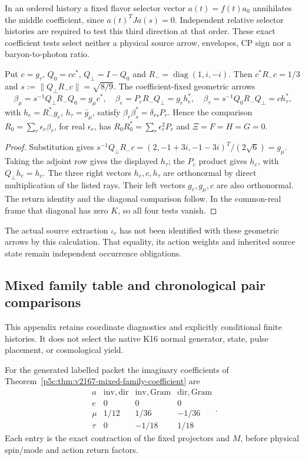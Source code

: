 \documentclass[11pt,a4paper]{article}
\begin{document}
In an ordered history a fixed flavor selector vector $a(t)=f(t)a_0$
annihilates the middle coefficient, since $a(t)^TJa(s)=0$.
Independent relative selector histories are required to test this third
direction at that order. These exact coefficient tests select neither a
physical source arrow, envelopes, CP sign nor a baryon-to-photon ratio.

\begin{corollary}
\label{p5c:cor:v2217-geometric-row-arrows}
Put $c=g_\tau$, $Q_0=cc^*$, $Q_\perp=I-Q_0$ and
$R_-=\operatorname{diag}(1,i,-i)$. Then
$c^*R_-c=1/3$ and $s:=\|Q_\perp R_-c\|=\sqrt{8/9}$.
The coefficient-fixed geometric arrows
\[
 \beta_\mu=s^{-1}Q_\perp R_-Q_0=g_\mu c^*,\quad
 \beta_e=P_eR_-Q_\perp=g_eh_e^*,\quad
 \beta_\tau=s^{-1}Q_0R_-Q_\perp=ch_\tau^*,
\]
with $h_e=R_-^*g_e$, $h_\tau=\bar g_\mu$, satisfy
$\beta_r\beta_s^*=\delta_{rs}P_r$. Hence the comparison
$R_0=\sum_r\epsilon_r\beta_r$, for real $\epsilon_r$, has
$R_0R_0^*=\sum_r\epsilon_r^2P_r$ and $\Xi=F=H=G=0$.
\end{corollary}
\begin{proof}
Substitution gives
$s^{-1}Q_\perp R_-c=(2,-1+3i,-1-3i)^T/(2\sqrt6)=g_\mu$.
Taking the adjoint row gives the displayed $h_\tau$; the $P_e$ product
gives $h_e$, with $Q_\perp h_e=h_e$. The three right vectors
$h_e,c,h_\tau$ are orthonormal by direct multiplication of the listed
rays. Their left vectors $g_e,g_\mu,c$ are also orthonormal. The return
identity and the diagonal comparison follow. In the common-real frame
that diagonal has zero $K$, so all four tests vanish.
\end{proof}
The actual source extraction $\iota_r$ has not been identified with these
geometric arrows by this calculation. That equality, its action weights
and inherited source state remain independent occurrence obligations.

\subsection{Mixed family table and chronological pair comparisons}
\label{p5c:app:v2167-cpbl2-comparisons}
This appendix retains coordinate diagnostics and explicitly conditional
finite histories. It does not select the native K16 normal generator,
state, pulse placement, or cosmological yield.

For the generated labelled packet the imaginary coefficients of
Theorem~\ref{p5c:thm:v2167-mixed-family-coefficient} are
\[
 \begin{array}{c|rrr}
 a&\mathrm{inv,dir}&\mathrm{inv,Gram}&\mathrm{dir,Gram}\\\hline
 e&0&0&0\\
 \mu&1/12&1/36&-1/36\\
 \tau&0&-1/18&1/18
 \end{array}.
\]
Each entry is the exact contraction of the fixed projectors and $M$,
before physical spin/mode and action return factors.
\end{document}
